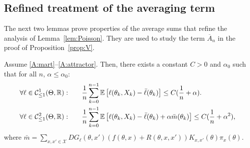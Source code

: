 \documentclass{article}
\newcommand{\R}{\mathbb{R}}
\newcommand{\calX}{\mathcal{X}}
\newcommand\E{\mathbb{E}}
\newcommand\esp[1]{\E\left[#1\right]}
\newcommand\cont[3][]{\mathcal{C}^{#2}_{\ifthenelse{\equal{#1}{all}}{}{\le1}}(#3,\R)}
\begin{document}
\subsection{Refined treatment of the averaging term}

The next two lemmas prove properties of the average sums that refine the analysis of Lemma~\ref{lem:Poisson}. They are used to study the term $\overline{A}_{n}$ in the proof of Proposition~\ref{prop:V}.

\begin{lemma}
    \label{lem:Poisson2}
    Assume \ref{A:mart}--\ref{A:attractor}. Then, there exists a constant $C>0$ and $\alpha_0$ such that for all $n$, $\alpha\le\alpha_0$:
    \begin{align}
        \forall\ell\in\cont{1}{\Theta}: \qquad
        &\frac1n \sum_{k=0}^{n-1}\esp{\ell(\theta_{k},X_{k})- \bar{\ell}(\theta_{k})} \leq C(\frac{1}{n}+\alpha).
        \label{eq:decoupled_accuracy_lemma2}\\
        \forall\ell\in\cont{2}{\Theta}: \qquad
        &\frac1n \sum_{k=0}^{n-1}\esp{\ell(\theta_{k},X_{k})- \bar{\ell}(\theta_{k}) + \alpha \bar{m}(\theta_k)} \leq C(\frac{1}{n}+\alpha^2)\label{eq:decoupled_accuracy_lemma3},
    \end{align}
    where $\bar{m}=\sum_{x,x'\in\calX} DG_\ell(\theta, x') (f(\theta,x) + R(\theta,x,x'))K_{x,x'}(\theta)\pi_x(\theta)$.
\end{lemma}
\end{document}
